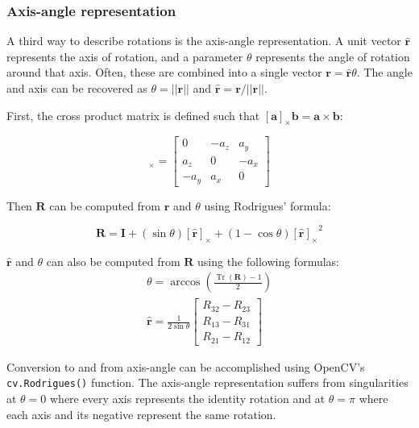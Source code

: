\documentclass{article}
\begin{document}
\subsubsection{Axis-angle representation}
A third way to describe rotations is the axis-angle representation. A unit vector $\mathbf{\hat r}$ represents the axis of rotation, and a parameter $\theta$ represents the angle of rotation around that axis. Often, these are combined into a single vector $\mathbf{r}=\mathbf{\hat r} \theta$. The angle and axis can be recovered as $\theta=||\mathbf{r}||$ and $\mathbf{\hat{r}} = \mathbf{r}/||\mathbf{r}||$.

First, the cross product matrix is defined such that $[\mathbf{a}]_\times \mathbf{b} = \mathbf{a} \times \mathbf{b}$:

\begin{equation*}
    [\mathbf{a}]_\times =  \begin{bmatrix} 0 & -a_z & a_y \\ a_z & 0 & -a_x \\ -a_y & a_x & 0 \end{bmatrix}
\end{equation*}

Then $\mathbf{R}$ can be computed from $\mathbf{\hat r}$ and $\theta$ using Rodrigues' formula:

\begin{equation*}
    \mathbf{R} = \mathbf{I} + (\sin\theta) \mathbf{[\mathbf{\hat{r}}]_\times} + (1-\cos\theta)\mathbf{[\mathbf{\hat{r}}]_\times}^2
\end{equation*}

$\mathbf{\hat r}$ and $\theta$ can also be computed from $\mathbf{R}$ using the following formulas:
\begin{gather*}
    \theta = \arccos\left( \frac{\operatorname{Tr}(\mathbf{R}) - 1}{2} \right) \\
    \mathbf{\hat r} = \frac{1}{2 \sin \theta} \begin{bmatrix} R_{32}-R_{23} \\ R_{13}-R_{31} \\ R_{21}-R_{12} \end{bmatrix}
\end{gather*}

Conversion to and from axis-angle can be accomplished using OpenCV's \verb|cv.Rodrigues()| function. The axis-angle representation suffers from singularities at $\theta=0$ where every axis represents the identity rotation and at $\theta=\pi$ where each axis and its negative represent the same rotation.
\end{document}
